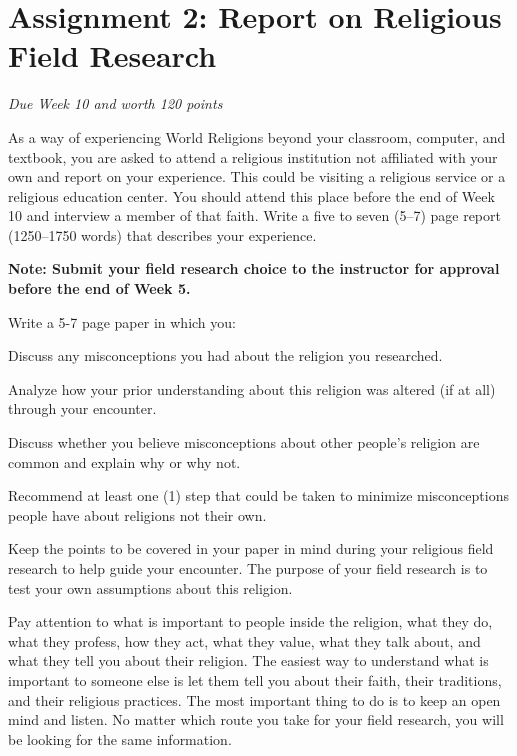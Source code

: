\pagebreak
\section*{Assignment 2: Report on Religious Field Research}
\emph{Due Week 10 and worth 120 points}

As a way of experiencing World Religions beyond your classroom, computer, and textbook, you are asked to attend a religious institution not affiliated with your own and report on your experience. This could be visiting a religious service or a religious education center. You should attend this place before the end of Week 10 and interview a member of that faith. Write a five to seven (5--7) page report (1250--1750 words) that describes your experience.

\textbf{Note: Submit your field research choice to the instructor for approval before the end of Week 5.}

Write a 5-7 page paper in which you:
\begin{enumerate*}
	\item Discuss any misconceptions you had about the religion you researched.
	\item Analyze how your prior understanding about this religion was altered (if at all) through your encounter.
	\item Discuss whether you believe misconceptions about other people's religion are common and explain why or why not.
	\item Recommend at least one (1) step that could be taken to minimize misconceptions people have about religions not their own.
\end{enumerate*}

Keep the points to be covered in your paper in mind during your religious field research to help guide your encounter. The purpose of your field research is to test your own assumptions about this religion.  

Pay attention to what is important to people inside the religion, what they do, what they profess, how they act, what they value, what they talk about, and what they tell you about their religion. The easiest way to understand what is important to someone else is let them tell you about their faith, their traditions, and their religious practices. The most important thing to do is to keep an open mind and listen. No matter which route you take for your field research, you will be looking for the same information.

